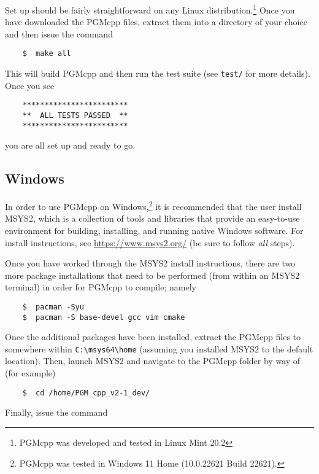 \documentclass[12pt, letterpaper]{report}
\begin{document}
Set up should be fairly straightforward on any Linux distribution.\footnote{PGMcpp was developed and tested in Linux Mint 20.2} Once you have downloaded the PGMcpp files, extract them into a directory of your choice and then issue the command

\begin{verbatim}
    $  make all
\end{verbatim}

\noindent This will build PGMcpp and then run the test suite (see \texttt{test/} for more details). Once you see

\begin{verbatim}
    ************************
    **  ALL TESTS PASSED  **
    ************************
\end{verbatim}

\noindent you are all set up and ready to go.

\subsection{Windows}

In order to use PGMcpp on Windows,\footnote{PGMcpp was tested in Windows 11 Home (10.0.22621 Build 22621).} it is recommended that the user install MSYS2, which is a collection of tools and libraries that provide an easy-to-use environment for building, installing, and running native Windows software. For install instructions, see \url{https://www.msys2.org/} (be sure to follow \textit{all} steps).\par
Once you have worked through the MSYS2 install instructions, there are two more package installations that need to be performed (from within an MSYS2 terminal) in order for PGMcpp to compile; namely

\begin{verbatim}
    $  pacman -Syu
    $  pacman -S base-devel gcc vim cmake
\end{verbatim}

Once the additional packages have been installed, extract the PGMcpp files to somewhere within \texttt{C:\textbackslash msys64\textbackslash home} (assuming you installed MSYS2 to the default location). Then, launch MSYS2 and navigate to the PGMcpp folder by way of (for example)

\begin{verbatim}
    $  cd /home/PGM_cpp_v2-1_dev/
\end{verbatim}

\noindent Finally, issue the command
\end{document}
